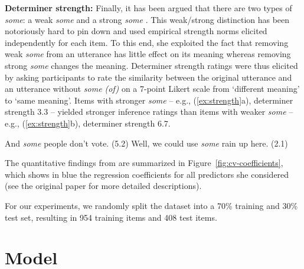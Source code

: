 \documentclass[11pt,a4paper]{article}
\newcommand{\figref}[1]{Figure~\ref{#1}}
\begin{document}
\noindent\textbf{Determiner strength:} Finally, it has been argued that there are two types of \emph{some}: a weak \emph{some} and a strong \emph{some} \cite{milsark1974,barwise1981}. This weak/strong distinction has been notoriously hard to pin down \cite{horn1997} and  used empirical strength norms elicited independently for each item. To this end, she exploited the fact that removing weak \textit{some} from an utterance has little effect on its meaning whereas removing strong \emph{some} changes the meaning.  Determiner strength ratings were thus elicited by asking participants to rate the similarity between the original utterance and an utterance without \emph{some (of)} on a 7-point Likert scale from `different meaning' to `same meaning'. Items with stronger \emph{some} -- e.g., (\ref{ex:strength}a), determiner strength 3.3 -- yielded stronger inference ratings than items with weaker \emph{some} -- e.g., (\ref{ex:strength}b), determiner strength 6.7.
\vspace{-.2em}
\begin{exe}
\small
    \ex \label{ex:strength} \begin{xlist}
    \ex And \emph{some} people don't vote. \hfill (5.2)
    \ex  Well, we could use \emph{some} rain up here. \hfill (2.1)
    \end{xlist}
\end{exe}
\vspace{-.4em}

The quantitative findings from  are summarized in \figref{fig:cv-coefficients}, which shows in blue the regression coefficients for all predictors she considered (see the original paper for more detailed descriptions). 

For our experiments, we randomly split the dataset into a 70\% training and 30\% test set, resulting in 954 training items and 408 test items.


\section{Model}
\end{document}
